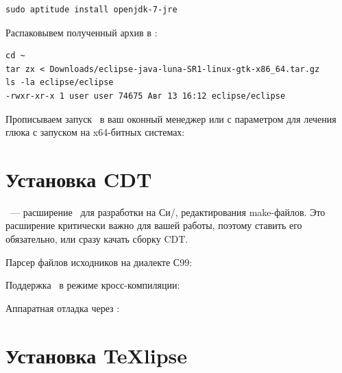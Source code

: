 \begin{verbatim}
sudo aptitude install openjdk-7-jre
\end{verbatim}

Распаковывем полученный архив
в :

\begin{verbatim}
cd ~
tar zx < Downloads/eclipse-java-luna-SR1-linux-gtk-x86_64.tar.gz 
ls -la eclipse/eclipse
-rwxr-xr-x 1 user user 74675 Авг 13 16:12 eclipse/eclipse
\end{verbatim}

Прописываем запуск \eclipse\ в ваш оконный менеджер или 
с параметром  для лечения глюка с запуском на x64-битных
системах:


\section{Установка CDT}

\href{https://eclipse.org/cdt/}{}\ --- расширение \eclipse\ для
разработки на Си/\cpp, редактирования make-файлов. Это расширение критически
важно для вашей работы, поэтому ставить его обязательно, или сразу качать сборку
CDT\eclipse.
\bigskip









Парсер файлов исходников на диалекте С99:

Поддержка \ в режиме кросс-компиляции:

Аппаратная отладка через :


\section{Установка TeXlipse}

